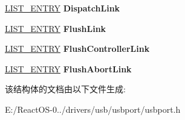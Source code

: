 \begin{DoxyCompactItemize}
\item 
\mbox{\label{struct___u_s_b_p_o_r_t___e_n_d_p_o_i_n_t_acb559ae85eda8c6cf1fac6e8b1a5f168}} 
\hyperlink{struct___l_i_s_t___e_n_t_r_y}{L\+I\+S\+T\+\_\+\+E\+N\+T\+RY} {\bfseries Dispatch\+Link}
\item 
\mbox{\label{struct___u_s_b_p_o_r_t___e_n_d_p_o_i_n_t_ae53e2537ca39783594fd3032d3abb0a8}} 
\hyperlink{struct___l_i_s_t___e_n_t_r_y}{L\+I\+S\+T\+\_\+\+E\+N\+T\+RY} {\bfseries Flush\+Link}
\item 
\mbox{\label{struct___u_s_b_p_o_r_t___e_n_d_p_o_i_n_t_a01a9d660c39ce9d5279fcac1c90e3773}} 
\hyperlink{struct___l_i_s_t___e_n_t_r_y}{L\+I\+S\+T\+\_\+\+E\+N\+T\+RY} {\bfseries Flush\+Controller\+Link}
\item 
\mbox{\label{struct___u_s_b_p_o_r_t___e_n_d_p_o_i_n_t_a5483416ef1a51be91ac8a21f3087df77}} 
\hyperlink{struct___l_i_s_t___e_n_t_r_y}{L\+I\+S\+T\+\_\+\+E\+N\+T\+RY} {\bfseries Flush\+Abort\+Link}
\end{DoxyCompactItemize}


该结构体的文档由以下文件生成\+:\begin{DoxyCompactItemize}
\item 
E\+:/\+React\+O\+S-\/0../drivers/usb/usbport/usbport.\+h\end{DoxyCompactItemize}
